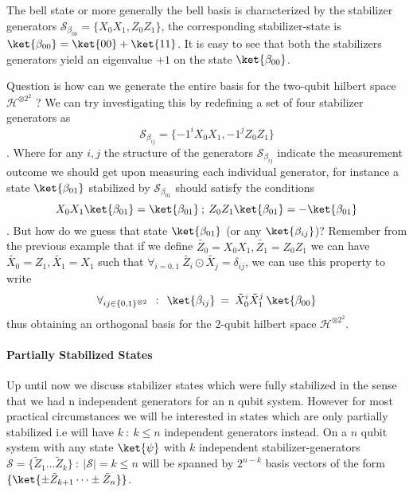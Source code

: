 \documentclass[
]{article}
\begin{document}
The bell state or more generally the bell basis is characterized by the
stabilizer generators
\(\mathcal{S}_{\beta_{00}}= \{X_{0}X_{1}, Z_{0}Z_{1} \}\), the
corresponding stabilizer-state is
\(\ket{\beta_{00}} = \ket{00} + \ket{11}\). It is easy to see that both
the stabilizers generators yield an eigenvalue \(+1\) on the state
\(\ket{\beta_{00}}\).

Question is how can we generate the entire basis for the two-qubit
hilbert space \(\mathcal{H}^{\otimes2^2 }\) ? We can try investigating
this by redefining a set of four stabilizer generators as
\[\mathcal{S}_{\beta_{ij}} = \{ -1^{i}X_{0}X_{1},-1^{j} Z_{0}Z_{1} \} \].
Where for any \(i,j\) the structure of the generators
\(\mathcal{S}_{\beta_{ij}}\) indicate the measurement outcome we should
get upon measuring each individual generator, for instance a state
\(\ket{\beta_{01}}\) stabilized by \(\mathcal{S}_{\beta_{01}}\) should
satisfy the conditions
\[X_0X_{1}\ket{\beta_{01}}= \ket{\beta_{01}} \:; \: Z_0Z_{1}\ket{\beta_{01}}= -\ket{\beta_{01}}\].
But how do we guess that state \(\ket{\beta_{01}}\) (or any
\(\ket{\beta_{ij}}\))? Remember from the previous example that if we
define \(\tilde{Z_{0}}=X_0X_{1} , \tilde{Z_{1}}= Z_{0}Z_{1}\) we can
have \(\tilde{X_{0}}=Z_{1}, \tilde{X_{1}}=X_1\) such that
\(\forall_{i=0,1} \: \tilde{Z_{i}} \odot \tilde{X_{j}} = \delta_{ij}\),
we can use this property to write
\[\forall_{ij \in \{0,1\}^{\otimes 2}} \:\:: \:\: \ket{\beta_{ij}}  \: = \: \tilde{X}_{0}^{i} \tilde{X}_{1}^{j} \:\ket{\beta_{00}}\]
thus obtaining an orthogonal basis for the 2-qubit hilbert space
\(\mathcal{H}^{\otimes 2^{2}}\).

\hypertarget{partially-stabilized-states}{%
\paragraph{Partially Stabilized
States}\label{partially-stabilized-states}}

Up until now we discuss stabilizer states which were fully stabilized in
the sense that we had n independent generators for an n qubit system.
However for most practical circumstances we will be interested in states
which are only partially stabilized i.e will have \(k \: :\:k\leq n\)
independent generators instead. On a \(n\) qubit system with any state
\(\ket{\psi}\) with \(k\) independent stabilizer-generators
\(\mathcal{S} =\{\tilde{Z}_{1}\dots \tilde{Z}_{k}\}\::\: |\mathcal{S}|=k \leq n\)
will be spanned by \(2^{n-k}\) basis vectors of the form
\(\{\ket{\pm \tilde{Z}_{k+1} \dots \pm \tilde{Z}_{n}}\}\).
\end{document}
